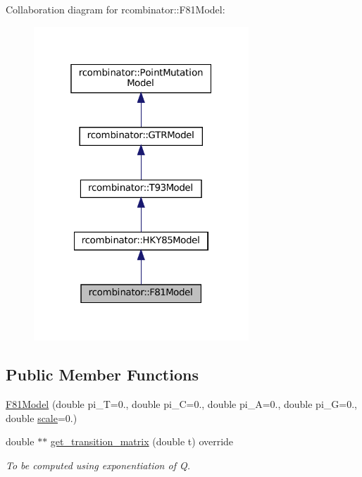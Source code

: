 Collaboration diagram for rcombinator\+:\+:F81\+Model\+:\nopagebreak
\begin{figure}[H]
\begin{center}
\leavevmode
\includegraphics[width=229pt]{classrcombinator_1_1F81Model__coll__graph}
\end{center}
\end{figure}
\subsection*{Public Member Functions}
\begin{DoxyCompactItemize}
\item 
\mbox{\hyperlink{classrcombinator_1_1F81Model_a6efce55b280e00a48471632574fe7944}{F81\+Model}} (double pi\+\_\+T=0., double pi\+\_\+C=0., double pi\+\_\+A=0., double pi\+\_\+G=0., double \mbox{\hyperlink{classrcombinator_1_1PointMutationModel_a328a30a438bb1b6a625faa3f714a85c8}{scale}}=0.)
\item 
\mbox{\label{classrcombinator_1_1F81Model_a7b8cc2e77bd7d15582aaa77aa876755c}} 
double $\ast$$\ast$ \mbox{\hyperlink{classrcombinator_1_1F81Model_a7b8cc2e77bd7d15582aaa77aa876755c}{get\+\_\+transition\+\_\+matrix}} (double t) override
\begin{DoxyCompactList}\small\item\em To be computed using exponentiation of Q. \end{DoxyCompactList}\end{DoxyCompactItemize}
